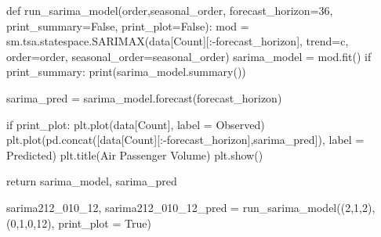 \documentclass[
  letterpaper,
  DIV=11,
  numbers=noendperiod]{scrartcl}
\newenvironment{Shaded}{\begin{snugshade}}{\end{snugshade}}
\newcommand{\BuiltInTok}[1]{\textcolor[rgb]{0.00,0.23,0.31}{#1}}
\newcommand{\ControlFlowTok}[1]{\textcolor[rgb]{0.00,0.23,0.31}{#1}}
\newcommand{\DecValTok}[1]{\textcolor[rgb]{0.68,0.00,0.00}{#1}}
\newcommand{\KeywordTok}[1]{\textcolor[rgb]{0.00,0.23,0.31}{#1}}
\newcommand{\NormalTok}[1]{\textcolor[rgb]{0.00,0.23,0.31}{#1}}
\newcommand{\OperatorTok}[1]{\textcolor[rgb]{0.37,0.37,0.37}{#1}}
\newcommand{\StringTok}[1]{\textcolor[rgb]{0.13,0.47,0.30}{#1}}
\newcommand{\VariableTok}[1]{\textcolor[rgb]{0.07,0.07,0.07}{#1}}
\begin{document}
\begin{Shaded}
\begin{Highlighting}[]
\KeywordTok{def}\NormalTok{ run\_sarima\_model(order,seasonal\_order, forecast\_horizon}\OperatorTok{=}\DecValTok{36}\NormalTok{, print\_summary}\OperatorTok{=}\VariableTok{False}\NormalTok{, print\_plot}\OperatorTok{=}\VariableTok{False}\NormalTok{):}
\NormalTok{    mod }\OperatorTok{=}\NormalTok{ sm.tsa.statespace.SARIMAX(data[}\StringTok{\textquotesingle{}Count\textquotesingle{}}\NormalTok{][:}\OperatorTok{{-}}\NormalTok{forecast\_horizon], trend}\OperatorTok{=}\StringTok{\textquotesingle{}c\textquotesingle{}}\NormalTok{, order}\OperatorTok{=}\NormalTok{order, seasonal\_order}\OperatorTok{=}\NormalTok{seasonal\_order)}
\NormalTok{    sarima\_model }\OperatorTok{=}\NormalTok{ mod.fit()}
    \ControlFlowTok{if}\NormalTok{ print\_summary:}
        \BuiltInTok{print}\NormalTok{(sarima\_model.summary())}

\NormalTok{    sarima\_pred }\OperatorTok{=}\NormalTok{ sarima\_model.forecast(forecast\_horizon)}
    
    \ControlFlowTok{if}\NormalTok{ print\_plot:}
\NormalTok{        plt.plot(data[}\StringTok{\textquotesingle{}Count\textquotesingle{}}\NormalTok{], label }\OperatorTok{=} \StringTok{\textquotesingle{}Observed\textquotesingle{}}\NormalTok{)}
\NormalTok{        plt.plot(pd.concat([data[}\StringTok{\textquotesingle{}Count\textquotesingle{}}\NormalTok{][:}\OperatorTok{{-}}\NormalTok{forecast\_horizon],sarima\_pred]), label }\OperatorTok{=} \StringTok{\textquotesingle{}Predicted\textquotesingle{}}\NormalTok{)}
\NormalTok{        plt.title(}\StringTok{\textquotesingle{}Air Passenger Volume\textquotesingle{}}\NormalTok{)}
\NormalTok{        plt.show()}
    
    \ControlFlowTok{return}\NormalTok{ sarima\_model, sarima\_pred}
\end{Highlighting}
\end{Shaded}

\begin{Shaded}
\begin{Highlighting}[]
\NormalTok{sarima212\_010\_12, sarima212\_010\_12\_pred }\OperatorTok{=}\NormalTok{ run\_sarima\_model((}\DecValTok{2}\NormalTok{,}\DecValTok{1}\NormalTok{,}\DecValTok{2}\NormalTok{), (}\DecValTok{0}\NormalTok{,}\DecValTok{1}\NormalTok{,}\DecValTok{0}\NormalTok{,}\DecValTok{12}\NormalTok{), print\_plot }\OperatorTok{=} \VariableTok{True}\NormalTok{)}
\end{Highlighting}
\end{Shaded}
\end{document}
